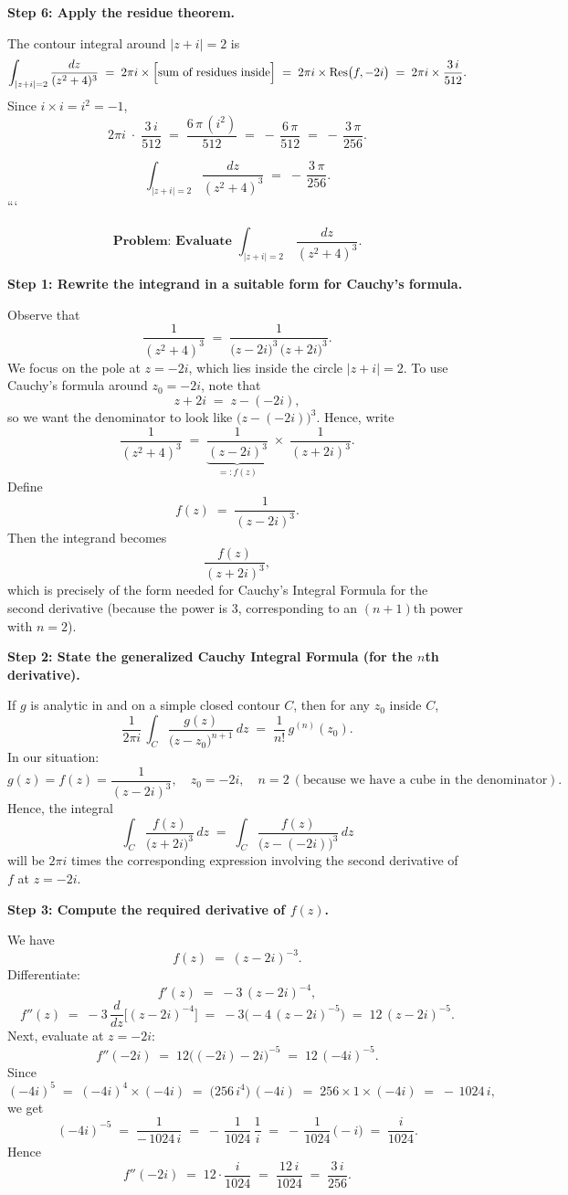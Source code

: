 \documentclass[12pt]{article}
\theoremstyle{definition} %
\theoremstyle{plain} %
\begin{document}
\textbf{Step 6: Apply the residue theorem.}

The contour integral around \(\lvert z+i\rvert=2\) is
\[
\int_{\lvert z+i\rvert=2} 
\frac{dz}{(z^2+4)^3}
\;=\;
2\pi i \times \Bigl[\text{sum of residues inside}\Bigr]
\;=\;
2\pi i \times \operatorname{Res}\bigl(f,-2i\bigr)
\;=\;
2\pi i \times \frac{3\,i}{512}.
\]
Since \(i \times i = i^2 = -1\),
\[
2\pi i \;\cdot\; \frac{3\,i}{512}
\;=\;
\frac{6\,\pi\, (i^2)}{512}
\;=\;
-\,\frac{6\,\pi}{512}
\;=\;
-\,\frac{3\,\pi}{256}.
\]

\[
\boxed{
\int_{\lvert z+i\rvert=2} \frac{dz}{(z^2+4)^3}
\;=\;
-\,\frac{3\,\pi}{256}.
}
\]```

\[
\textbf{Problem: Evaluate } 
\int_{\lvert z + i\rvert=2}\,\frac{dz}{(z^2 + 4)^3}.
\]

\textbf{Step 1: Rewrite the integrand in a suitable form for Cauchy's formula.}

Observe that
\[
\frac{1}{(z^2 + 4)^3}
\;=\;
\frac{1}{\bigl(z - 2i\bigr)^3 \,\bigl(z + 2i\bigr)^3}.
\]
We focus on the pole at \(z = -2i\), which lies inside the circle \(\lvert z + i\rvert = 2\).  
To use Cauchy's formula around \(z_0 = -2i\), note that
\[
z + 2i \;=\; z - (-2i),
\]
so we want the denominator to look like \(\bigl(z - (-2i)\bigr)^3\).  Hence, write
\[
\frac{1}{(z^2 + 4)^3}
\;=\;
\underbrace{\frac{1}{(z - 2i)^3}}_{=:f(z)} 
\;\times\;
\frac{1}{(z + 2i)^3}.
\]
Define
\[
f(z) \;=\; \frac{1}{(z - 2i)^3}.
\]
Then the integrand becomes
\[
\frac{f(z)}{(z + 2i)^3},
\]
which is precisely of the form needed for Cauchy's Integral Formula for the second derivative (because the power is 3, corresponding to an \((n+1)\)th power with \(n=2\)).

\textbf{Step 2: State the generalized Cauchy Integral Formula (for the \(n\)th derivative).}

If \(g\) is analytic in and on a simple closed contour \(C\), then for any \(z_0\) inside \(C\),  
\[
\frac{1}{2\pi i}\,\int_C 
\frac{g(z)}{\bigl(z - z_0\bigr)^{n+1}}
\,dz
\;=\;
\frac{1}{n!}\,g^{(n)}(z_0).
\]
In our situation:
\[
g(z) = f(z) = \frac{1}{(z - 2i)^3},
\quad
z_0 = -2i,
\quad
n = 2
\ (\text{because we have a cube in the denominator}).
\]
Hence, the integral
\[
\int_C \frac{f(z)}{\bigl(z + 2i\bigr)^3}\,dz
\;=\;
\int_C \frac{f(z)}{\bigl(z - (-2i)\bigr)^3}\,dz
\]
will be \(2\pi i\) times the corresponding expression involving the second derivative of \(f\) at \(z=-2i\).

\textbf{Step 3: Compute the required derivative of \(f(z)\).}

We have
\[
f(z) \;=\; (z - 2i)^{-3}.
\]
Differentiate:
\[
f'(z) 
\;=\;
-3\,(z - 2i)^{-4},
\]
\[
f''(z)
\;=\;
-3\,\frac{d}{dz}\bigl[(z - 2i)^{-4}\bigr]
\;=\;
-3\bigl(-4\,(z - 2i)^{-5}\bigr)
\;=\;
12\,(z - 2i)^{-5}.
\]
Next, evaluate at \(z = -2i\):
\[
f''(-2i)
\;=\;
12\bigl((-2i) - 2i\bigr)^{-5}
\;=\;
12\,(-4i)^{-5}.
\]
Since
\[
(-4i)^5 
\;=\; 
(-4i)^4 \times (-4i) 
\;=\;
\bigl(256\,i^4\bigr)\,(-4i)
\;=\;
256\times 1 \times (-4i)
\;=\;
-\,1024\,i,
\]
we get
\[
(-4i)^{-5}
\;=\;
\frac{1}{-\,1024\,i}
\;=\;
-\,\frac{1}{1024}\,\frac{1}{i}
\;=\;
-\,\frac{1}{1024}\,\bigl(-i\bigr)
\;=\;
\frac{i}{1024}.
\]
Hence
\[
f''(-2i)
\;=\;
12 \cdot \frac{i}{1024}
\;=\;
\frac{12\,i}{1024}
\;=\;
\frac{3\,i}{256}.
\]
\end{document}
